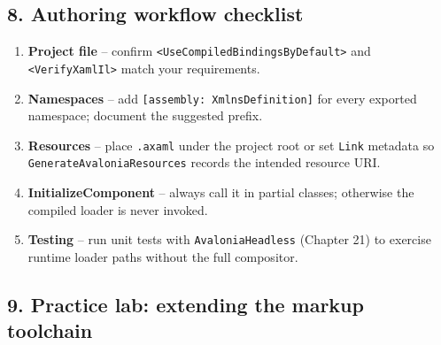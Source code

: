 \subsection{8. Authoring workflow
checklist}\label{authoring-workflow-checklist}

\begin{enumerate}
\def\labelenumi{\arabic{enumi}.}
\tightlist
\item
  \textbf{Project file} -- confirm
  \passthrough{\lstinline!<UseCompiledBindingsByDefault>!} and
  \passthrough{\lstinline!<VerifyXamlIl>!} match your requirements.
\item
  \textbf{Namespaces} -- add
  \passthrough{\lstinline![assembly: XmlnsDefinition]!} for every
  exported namespace; document the suggested prefix.
\item
  \textbf{Resources} -- place \passthrough{\lstinline!.axaml!} under the
  project root or set \passthrough{\lstinline!Link!} metadata so
  \passthrough{\lstinline!GenerateAvaloniaResources!} records the
  intended resource URI.
\item
  \textbf{InitializeComponent} -- always call it in partial classes;
  otherwise the compiled loader is never invoked.
\item
  \textbf{Testing} -- run unit tests with
  \passthrough{\lstinline!AvaloniaHeadless!} (Chapter 21) to exercise
  runtime loader paths without the full compositor.
\end{enumerate}

\subsection{9. Practice lab: extending the markup
toolchain}\label{practice-lab-extending-the-markup-toolchain}

